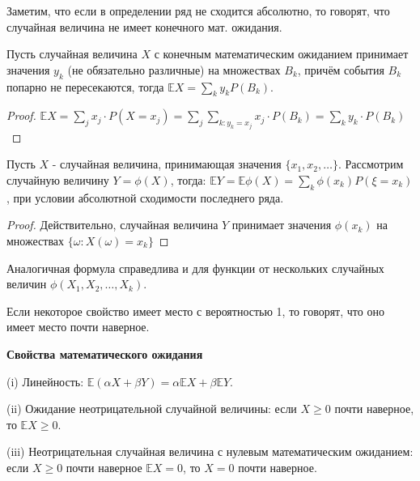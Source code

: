 \documentclass[a4paper]{article}
\begin{document}
\begin{colloq}
   	Заметим, что если в определении ряд не сходится абсолютно, то говорят, что случайная величина не имеет конечного мат. ожидания.
   	
   	\begin{lemma*}
   		Пусть случайная величина $X$ с конечным математическим ожиданием принимает значения $y_k$ (не обязательно различные) на множествах $B_k$, причём события $B_k$ попарно не пересекаются, тогда $\mathbb{E}X= \sum_{k} y_k P(B_k)$.
   	\end{lemma*}
   
   	\begin{proof}
   		$\mathbb{E}X = \sum_{j} x_j \cdot P(X = x_j) = \sum_{j} \sum_{k: y_k = x_j} x_j \cdot P(B_k) = \sum_{k} y_k \cdot P(B_k)$
   	\end{proof}
   	
   	\begin{theorem*}
   		Пусть $X$ - случайная величина, принимающая значения $\{ x_1, x_2, \dots \}$. Рассмотрим случайную величину $Y = \phi(X)$, тогда: $\mathbb{E} Y= \mathbb{E} \phi(X) = \sum_{k} \phi(x_k) P(\xi = x_k)$,
   		при условии абсолютной сходимости последнего ряда.
   	\end{theorem*}
   	
   	\begin{proof}
   		Действительно, случайная величина $Y$ принимает значения $\phi(x_k)$ на множествах $\{ \omega: X(\omega)=x_k \}$	
   	\end{proof}

   	Аналогичная формула справедлива и для функции от нескольких случайных величин $\phi(X_1, X_2, \dots, X_k)$.
   	
   	\begin{definition*}
   		Если некоторое свойство имеет место с вероятностью 1, то говорят, что оно имеет место почти наверное.
   	\end{definition*}
   	
   	\textbf{Свойства математического ожидания}
   	
   	(i) Линейность: $\mathbb{E}(\alpha X + \beta Y) = \alpha \mathbb{E}X + \beta \mathbb{E}Y$.
   		
	(ii) Ожидание неотрицательной случайной величины: если $X \geqslant 0$ почти наверное, то $\mathbb{E}X \geqslant 0$.
   			
	(iii) Неотрицательная случайная величина с нулевым математическим ожиданием: если $X \geqslant 0$ почти наверное $\mathbb{E}X = 0$, то $X = 0$ почти наверное.


\end{colloq}
\end{document}
